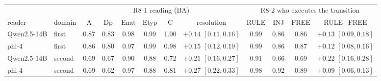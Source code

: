 \begin{tabular}{ll ccccc c ccc c}
\toprule
 & & \multicolumn{6}{c}{R8-1 reading (BA)} & \multicolumn{4}{c}{R8-2 who executes the transition} \\
\cmidrule(lr){3-8}\cmidrule(lr){9-12}
reader & domain & A & Dp & Enat & Etyp & C & resolution & RULE & INJ & FREE & RULE$-$FREE \\
\midrule
Qwen2.5-14B & first & 0.87 & 0.83 & 0.98 & 0.99 & 1.00 & $+0.14$ $[0.11,0.16]$ & 0.99 & 0.86 & 0.86 & $+0.13$ $[0.09,0.18]$ \\
phi-4 & first & 0.86 & 0.80 & 0.97 & 0.99 & 0.98 & $+0.15$ $[0.12,0.19]$ & 0.99 & 0.86 & 0.87 & $+0.12$ $[0.08,0.16]$ \\
Qwen2.5-14B & second & 0.69 & 0.67 & 0.90 & 0.88 & 0.72 & $+0.21$ $[0.16,0.27]$ & 0.91 & 0.66 & 0.69 & $+0.22$ $[0.16,0.28]$ \\
phi-4 & second & 0.69 & 0.62 & 0.97 & 0.88 & 0.81 & $+0.27$ $[0.22,0.33]$ & 0.98 & 0.92 & 0.89 & $+0.09$ $[0.06,0.13]$ \\
\bottomrule
\end{tabular}
